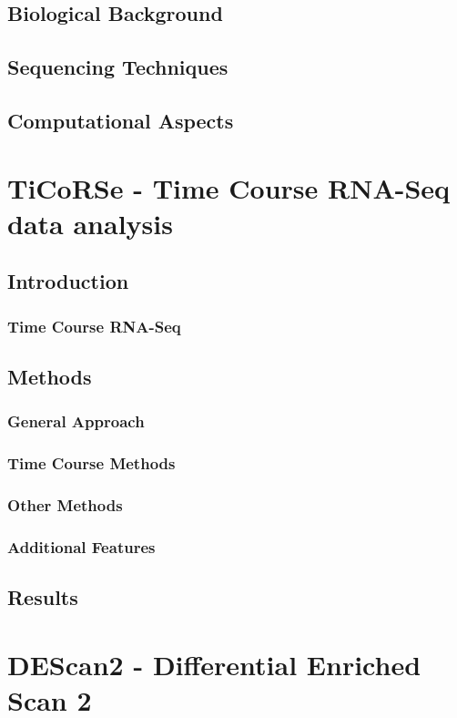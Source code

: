 \documentclass[b5paper,oneside,british,intoc,bibliograph=totoc,index=totoc,BCOR10mm,twoside,openright]{book}
\numberwithin{equation}{section}
\numberwithin{figure}{section}
\begin{document}
\section{Biological Background}


\section{Sequencing Techniques}


\section{Computational Aspects}


\chapter{TiCoRSe - Time Course RNA-Seq data analysis}
\section{Introduction}
\subsection{Time Course RNA-Seq}
\section{Methods}
\subsection{General Approach}
\subsection{Time Course Methods}
\subsection{Other Methods}
\subsection{Additional Features}
\section{Results}


\chapter{DEScan2 - Differential Enriched Scan 2}

\end{document}
